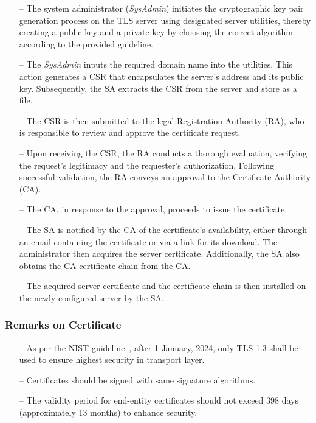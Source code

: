 \documentclass[pdflatex,sn-mathphys-num]{sn-jnl}%
\theoremstyle{thmstyleone}%
\theoremstyle{thmstyletwo}%
\theoremstyle{thmstylethree}%
\begin{document}
\begin{enumerate}
    
    \item[--] The system administrator (\emph{SysAdmin}) initiates the cryptographic key pair generation process on the TLS server using designated server utilities, thereby creating a public key and a private key by choosing the correct algorithm according to the provided guideline. 

    \item[--] The \emph{SysAdmin} inputs the required domain name into the utilities. This action generates a CSR that encapsulates the server's address and its public key. Subsequently, the SA extracts the CSR from the server and store as a file.

    \item[--] The CSR is then submitted to the legal Registration Authority (RA), who is responsible to review and approve the certificate request.

    \item[--] Upon receiving the CSR, the RA conducts a thorough evaluation, verifying the request's legitimacy and the requester's authorization. Following successful validation, the RA conveys an approval to the Certificate Authority (CA).

    \item[--] The CA, in response to the approval, proceeds to issue the certificate.

    \item[--] The SA is notified by the CA of the certificate's availability, either through an email containing the certificate or via a link for its download. The administrator then acquires the server certificate. Additionally, the SA also obtains the CA certificate chain from the CA.

    \item[--] The acquired server certificate and the certificate chain is then installed on the newly configured server by the SA.

\end{enumerate}    

\subsubsection*{Remarks on Certificate}
\begin{itemize}
    \item[--] As per the NIST guideline~\cite{NIST-SP-800-52-r2}, after 1 January, 2024, only TLS 1.3  shall be used to ensure highest security in transport layer.
    \item[--] Certificates should be signed with same signature algorithms.
    \item[--] The validity period for end-entity certificates should not exceed 398 days (approximately 13 months) to enhance security.
\end{itemize}
\end{document}
